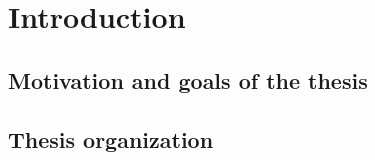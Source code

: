 
\chapter{Introduction}

\section{Motivation and goals of the thesis}
%

\section{Thesis organization}
%
